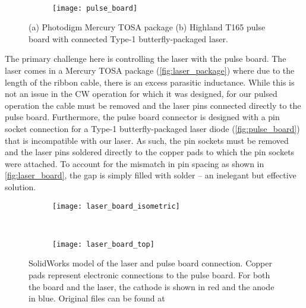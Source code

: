 \begin{figure}[tb]
    \begin{subfigure}[t]{0.5\textwidth}
        \centering
        \caption{}
        \label{fig:laser_package}
    \end{subfigure}~%
    \begin{subfigure}[t]{0.5\textwidth}
        \centering
        \texttt{[image: pulse\_board]}
        \caption{}
        \label{fig:pulse_board}
    \end{subfigure}
    \caption{(a) Photodigm Mercury TOSA package (b) Highland T165 pulse board with connected Type-1 butterfly-packaged laser.}
\end{figure}

The primary challenge here is controlling the laser with the pulse board. The laser comes in a Mercury TOSA package (\autoref{fig:laser_package}) where due to the length of the ribbon cable, there is an excess parasitic inductance. While this is not an issue in the CW operation for which it was designed, for our pulsed operation the cable must be removed and the laser pins connected directly to the pulse board. Furthermore, the pulse board connector is designed with a pin socket connection for a Type-1 butterfly-packaged
laser diode (\autoref{fig:pulse_board}) that is incompatible with our laser. As such, the pin sockets must be removed and the laser pins soldered directly to the copper pads to which the pin sockets were attached. To account for the mismatch in pin spacing as shown in \autoref{fig:laser_board}, the gap is simply filled with solder -- an inelegant but effective solution.

\begin{figure}[tb]
    \begin{subfigure}{0.5\textwidth}
        \centering
        \texttt{[image: laser\_board\_isometric]}
    \end{subfigure}~%
    \begin{subfigure}{0.5\textwidth}
        \centering
        \texttt{[image: laser\_board\_top]}
    \end{subfigure}
    \caption{SolidWorks model of the laser and pulse board connection. Copper pads represent electronic connections to the pulse board. For both the board and the laser, the cathode is shown in red and the anode in blue. Original files can be found at \coderepolink}
    \label{fig:laser_board}
\end{figure}

